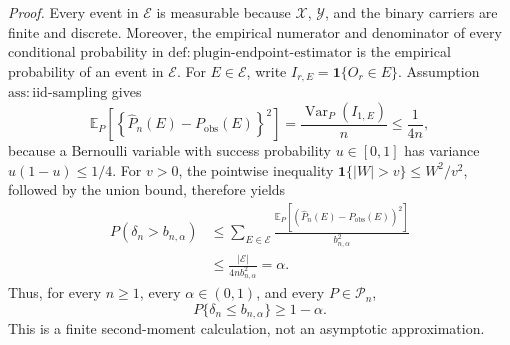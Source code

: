 \noindent\textit{Proof.}
Every event in \(\mathcal E\) is measurable because \(\mathcal X\), \(\mathcal Y\), and the binary carriers are finite and discrete.  Moreover, the empirical numerator and denominator of every conditional probability in \(\mathrm{def{:}plugin\text{-}endpoint\text{-}estimator}\) is the empirical probability of an event in \(\mathcal E\).  For \(E\in\mathcal E\), write \(I_{r,E}=\mathbf 1\{O_r\in E\}\).  Assumption \(\mathrm{ass{:}iid\text{-}sampling}\) gives
\[
\mathbb E_P\!\left[
 \left\{\widehat P_n(E)-P_{\mathrm{obs}}(E)\right\}^{2}
 \right]
=\frac{\operatorname{Var}_P(I_{1,E})}{n}
\le \frac{1}{4n},
\tag{1}
\]
because a Bernoulli variable with success probability \(u\in[0,1]\) has variance \(u(1-u)\le1/4\).  For \(v>0\), the pointwise inequality \(\mathbf 1\{|W|>v\}\le W^2/v^2\), followed by the union bound, therefore yields
\[
\begin{aligned}
P(\delta_n>b_{n,\alpha})
&\le \sum_{E\in\mathcal E}
 \frac{\mathbb E_P[(\widehat P_n(E)-P_{\mathrm{obs}}(E))^2]}
      {b_{n,\alpha}^2}\\
&\le\frac{|\mathcal E|}{4n b_{n,\alpha}^2}=\alpha.
\end{aligned}
\tag{2}
\]
Thus, for every \(n\ge1\), every \(\alpha\in(0,1)\), and every \(P\in\mathcal P_n\),
\[
P\{\delta_n\le b_{n,\alpha}\}\ge1-\alpha.
\tag{3}
\]
This is a finite second-moment calculation, not an asymptotic approximation.

